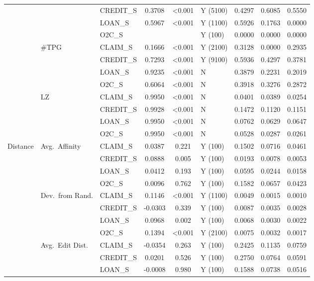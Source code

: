 \begin{longtable}{lllcclccc}
 &  & CREDIT\_S & 0.3708 & <0.001 & Y (5100) & 0.4297 & 0.6085 & 0.5550 \\
 &  & LOAN\_S & 0.5967 & <0.001 & Y (1100) & 0.5926 & 0.1763 & 0.0000 \\
 &  & O2C\_S &  &  & Y (100) & 0.0000 & 0.0000 & 0.0000 \\
\cmidrule(lr){2-9}
 & $\#\text{TPG}$ & CLAIM\_S & 0.1666 & <0.001 & Y (2100) & 0.3128 & 0.0000 & 0.2935 \\
 &  & CREDIT\_S & 0.7293 & <0.001 & Y (9100) & 0.5936 & 0.4297 & 0.3781 \\
 &  & LOAN\_S & 0.9235 & <0.001 & N & 0.3879 & 0.2231 & 0.2019 \\
 &  & O2C\_S & 0.6064 & <0.001 & N & 0.3918 & 0.3276 & 0.2872 \\
\cmidrule(lr){2-9}
 & $\text{LZ}$ & CLAIM\_S & 0.9950 & <0.001 & N & 0.0401 & 0.0389 & 0.0254 \\
 &  & CREDIT\_S & 0.9928 & <0.001 & N & 0.1472 & 0.1120 & 0.1151 \\
 &  & LOAN\_S & 0.9950 & <0.001 & N & 0.0762 & 0.0629 & 0.0647 \\
 &  & O2C\_S & 0.9950 & <0.001 & N & 0.0528 & 0.0287 & 0.0261 \\
\cmidrule(lr){1-9}
Distance & Avg.\ Affinity & CLAIM\_S & 0.0387 & 0.221 & Y (100) & 0.1502 & 0.0716 & 0.0461 \\
 &  & CREDIT\_S & 0.0888 & 0.005 & Y (100) & 0.0193 & 0.0078 & 0.0053 \\
 &  & LOAN\_S & 0.0412 & 0.193 & Y (100) & 0.0595 & 0.0244 & 0.0158 \\
 &  & O2C\_S & 0.0096 & 0.762 & Y (100) & 0.1582 & 0.0657 & 0.0423 \\
\cmidrule(lr){2-9}
 & Dev.\ from Rand. & CLAIM\_S & 0.1146 & <0.001 & Y (1100) & 0.0049 & 0.0015 & 0.0010 \\
 &  & CREDIT\_S & -0.0303 & 0.339 & Y (100) & 0.0087 & 0.0035 & 0.0028 \\
 &  & LOAN\_S & 0.0968 & 0.002 & Y (100) & 0.0068 & 0.0030 & 0.0022 \\
 &  & O2C\_S & 0.1394 & <0.001 & Y (2100) & 0.0075 & 0.0032 & 0.0017 \\
\cmidrule(lr){2-9}
 & Avg.\ Edit Dist. & CLAIM\_S & -0.0354 & 0.263 & Y (100) & 0.2425 & 0.1135 & 0.0759 \\
 &  & CREDIT\_S & 0.0201 & 0.526 & Y (100) & 0.2750 & 0.0764 & 0.0591 \\
 &  & LOAN\_S & -0.0008 & 0.980 & Y (100) & 0.1588 & 0.0738 & 0.0516 \\

\end{longtable}
